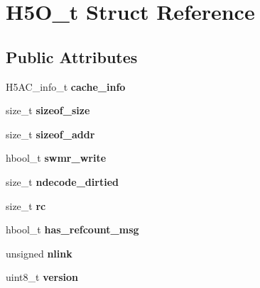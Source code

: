 \hypertarget{struct_h5_o__t}{}\section{H5\+O\+\_\+t Struct Reference}
\label{struct_h5_o__t}
\subsection*{Public Attributes}
\begin{DoxyCompactItemize}
\item 
\mbox{\label{struct_h5_o__t_a5a148226a6c7ee963135d368e841a002}} 
H5\+A\+C\+\_\+info\+\_\+t {\bfseries cache\+\_\+info}
\item 
\mbox{\label{struct_h5_o__t_a677f15e676f5fba0fd080e1d072099ad}} 
size\+\_\+t {\bfseries sizeof\+\_\+size}
\item 
\mbox{\label{struct_h5_o__t_a2cb566fc417f38e34c4d225980416a96}} 
size\+\_\+t {\bfseries sizeof\+\_\+addr}
\item 
\mbox{\label{struct_h5_o__t_a95d4dfe3d3971a9e532ab55ceb4ffe05}} 
hbool\+\_\+t {\bfseries swmr\+\_\+write}
\item 
\mbox{\label{struct_h5_o__t_ad8894b3cafdce4393d08d5ceb4025e99}} 
size\+\_\+t {\bfseries ndecode\+\_\+dirtied}
\item 
\mbox{\label{struct_h5_o__t_aa1d738d37a782a121e70add07eec4159}} 
size\+\_\+t {\bfseries rc}
\item 
\mbox{\label{struct_h5_o__t_afd6111f08e9f7c90a416ac3d7519b674}} 
hbool\+\_\+t {\bfseries has\+\_\+refcount\+\_\+msg}
\item 
\mbox{\label{struct_h5_o__t_a6ea2773c58ed38c74c5af4c6e992c93a}} 
unsigned {\bfseries nlink}
\item 
\mbox{\label{struct_h5_o__t_a1f743e8289af8c7baa71c408375481e4}} 
uint8\+\_\+t {\bfseries version}
\item 
\mbox{\label{struct_h5_o__t_aed926a49e9a95b61c8043bcea4e54715}} 

\end{DoxyCompactItemize}
